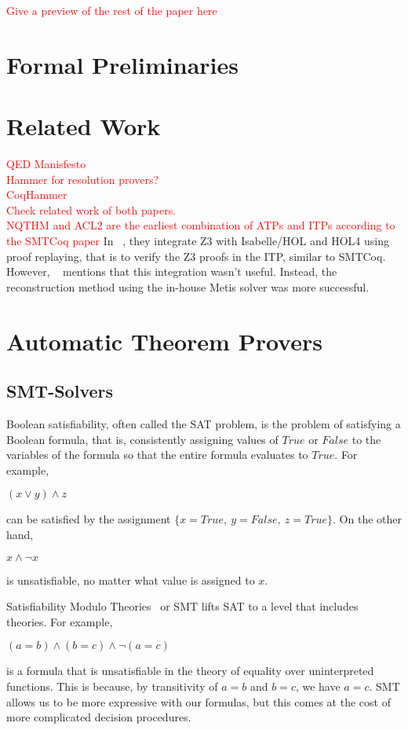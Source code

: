 \documentclass{article}
\begin{document}
	\textcolor{red}{Give a preview of the rest of the paper here}

\section{Formal Preliminaries}
\label{sec:prelim}

\section{Related Work}
\label{sec:rel}
	\textcolor{red}{QED Manisfesto}\\
	\textcolor{red}{Hammer for resolution provers?}\\
	\textcolor{red}{CoqHammer}\\
	\textcolor{red}{Check related work of both papers.}\\
	\textcolor{red}{NQTHM and ACL2 are the earliest combination of ATPs and ITPs according to the SMTCoq paper}
	In ~\cite{10.1007/978-3-642-14052-5_14}, they integrate 
	Z3 with Isabelle/HOL and HOL4 
	using proof replaying, that is to verify 
	the Z3 proofs in the ITP, similar to SMTCoq. However, 
	~\cite{10.1007/978-3-642-22438-6_11} mentions that this
	integration wasn't useful. Instead, the reconstruction 
	method using the in-house Metis solver was more 
	successful. 
	
\section{Automatic Theorem Provers}
\label{sec:atp}	
\subsection{SMT-Solvers}
\label{smt}
	Boolean satisfiability, often called the SAT problem, 
	is the problem of satisfying a Boolean formula, that is, 
	consistently assigning values of $True$ or $False$ 
	to the variables of the formula so that the entire 
	formula evaluates to $True$. For example,
	\begin{center}$(x \lor y) \land z$ \end{center}
	can be satisfied by the 
	assignment $\{x=True,\ y=False,\ z=True\}$. On the other hand, 
	\begin{center} $x \land \neg x$ \end{center}
	is unsatisfiable, no matter what value is assigned to $x$.
	
	Satisfiability Modulo Theories~\cite{DBLP:reference/mc/BarrettT18} 
	or SMT lifts SAT to a level that includes theories. 
	For example, 
	\begin{center} $(a = b) \land (b = c) \land \neg (a = c)$ 
	\end{center}
	is a formula that is unsatisfiable in the theory of 
	equality over uninterpreted functions. This is because, by
	transitivity of $a = b$ and $b = c$, we have $a = c$. SMT 
	allows us to be more expressive with our formulas, but 
	this comes at the cost of more complicated decision 
	procedures.
	
\end{document}
